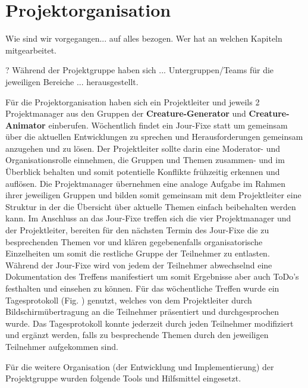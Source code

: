 \section{Projektorganisation}

Wie sind wir vorgegangen... auf alles bezogen. Wer hat an welchen Kapiteln mitgearbeitet.

? Während der Projektgruppe haben sich ... Untergruppen/Teams für die jeweiligen Bereiche ... herausgestellt.

Für die Projektorganisation haben sich ein Projektleiter und jeweils 2 Projektmanager aus den Gruppen der \textbf{Creature-Generator} und \textbf{Creature-Animator} einberufen. Wöchentlich findet ein Jour-Fixe statt um gemeinsam über die aktuellen Entwicklungen zu sprechen und Herausforderungen gemeinsam anzugehen und zu lösen. Der Projektleiter sollte darin eine Moderator- und Organisationsrolle einnehmen, die Gruppen und Themen zusammen- und im Überblick behalten und somit potentielle Konflikte frühzeitig erkennen und auflösen. Die Projektmanager übernehmen eine analoge Aufgabe im Rahmen ihrer jeweiligen Gruppen und bilden somit gemeinsam mit dem Projektleiter eine Struktur in der die Übersicht über aktuelle Themen einfach beibehalten werden kann. Im Anschluss an das Jour-Fixe treffen sich die vier Projektmanager und der Projektleiter, bereiten für den nächsten Termin des Jour-Fixe die zu besprechenden Themen vor und klären gegebenenfalls organisatorische Einzelheiten um somit die restliche Gruppe der Teilnehmer zu entlasten. Während der Jour-Fixe wird von jedem der Teilnehmer abwechselnd eine Dokumentation des Treffens manifestiert um somit Ergebnisse aber auch ToDo's festhalten und einsehen zu können. Für das wöchentliche Treffen wurde ein Tagesprotokoll (Fig. ) genutzt, welches von dem Projektleiter durch Bildschirmübertragung an die Teilnehmer präsentiert und durchgesprochen wurde. Das Tagesprotokoll konnte jederzeit durch jeden Teilnehmer modifiziert und ergänzt werden, falls zu besprechende Themen durch den jeweiligen Teilnehmer aufgekommen sind.

Für die weitere Organisation (der Entwicklung und Implementierung) der Projektgruppe wurden folgende Tools und Hilfsmittel eingesetzt. 

